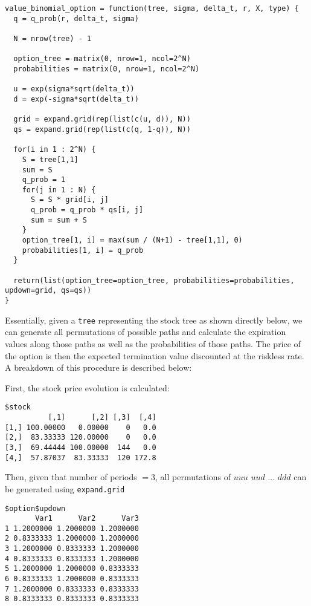 \documentclass[11pt]{scrartcl}
\begin{document}
\begin{lstlisting}
value_binomial_option = function(tree, sigma, delta_t, r, X, type) {
  q = q_prob(r, delta_t, sigma)
  
  N = nrow(tree) - 1
  
  option_tree = matrix(0, nrow=1, ncol=2^N)
  probabilities = matrix(0, nrow=1, ncol=2^N)
  
  u = exp(sigma*sqrt(delta_t))
  d = exp(-sigma*sqrt(delta_t))
  
  grid = expand.grid(rep(list(c(u, d)), N))
  qs = expand.grid(rep(list(c(q, 1-q)), N))
        
  for(i in 1 : 2^N) {
    S = tree[1,1]
    sum = S
    q_prob = 1
    for(j in 1 : N) {
      S = S * grid[i, j]
      q_prob = q_prob * qs[i, j]
      sum = sum + S
    }
    option_tree[1, i] = max(sum / (N+1) - tree[1,1], 0)
    probabilities[1, i] = q_prob
  }
    
  return(list(option_tree=option_tree, probabilities=probabilities, updown=grid, qs=qs))
}
\end{lstlisting}

Essentially, given a \texttt{tree} representing the stock tree as shown directly below, we can generate all permutations of possible paths and calculate the expiration values along those paths as well as the probabilities of those paths. The price of the option is then the expected termination value discounted at the riskless rate. A breakdown of this procedure is described below:

First, the stock price evolution is calculated:

\begin{lstlisting}
$stock
          [,1]      [,2] [,3]  [,4]
[1,] 100.00000   0.00000    0   0.0
[2,]  83.33333 120.00000    0   0.0
[3,]  69.44444 100.00000  144   0.0
[4,]  57.87037  83.33333  120 172.8
\end{lstlisting}

Then, given that number of periods $= 3$, all permutations of $uuu$ $uud$ ... $ddd$ can be generated using \texttt{expand.grid}

\begin{lstlisting}
$option$updown
       Var1      Var2      Var3
1 1.2000000 1.2000000 1.2000000
2 0.8333333 1.2000000 1.2000000
3 1.2000000 0.8333333 1.2000000
4 0.8333333 0.8333333 1.2000000
5 1.2000000 1.2000000 0.8333333
6 0.8333333 1.2000000 0.8333333
7 1.2000000 0.8333333 0.8333333
8 0.8333333 0.8333333 0.8333333
\end{lstlisting}
\end{document}

